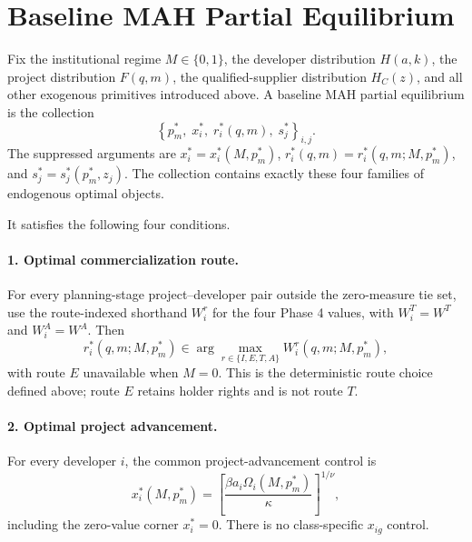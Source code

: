 \section{Baseline MAH Partial Equilibrium}
\label{sec:p07-equilibrium}

Fix the institutional regime \(M\in\{0,1\}\), the developer distribution
\(H(a,k)\), the project distribution \(F(q,m)\), the qualified-supplier
distribution \(H_C(z)\), and all other exogenous primitives introduced above.
A baseline MAH partial equilibrium is the collection
\begin{equation}
  \boxed{
  \left\{
    p_m^*,\;
    x_i^*,\;
    r_i^*(q,m),\;
    s_j^*
  \right\}_{i,j}}
  .
  \label{eq:p07-equilibrium-collection}
\end{equation}
The suppressed arguments are \(x_i^*=x_i^*(M,p_m^*)\),
\(r_i^*(q,m)=r_i^*(q,m;M,p_m^*)\), and
\(s_j^*=s_j^*(p_m^*,z_j)\). The collection contains exactly these four
families of endogenous optimal objects.

It satisfies the following four conditions.

\paragraph{1. Optimal commercialization route.}
For every planning-stage project--developer pair outside the zero-measure tie
set, use the route-indexed shorthand \(W_i^r\) for the four Phase 4
values, with \(W_i^T=W^T\) and \(W_i^A=W^A\). Then
\begin{equation}
  r_i^*(q,m;M,p_m^*)
  \in
  \arg\max_{r\in\{I,E,T,A\}}
  W_i^r(q,m;M,p_m^*),
  \label{eq:p07-route-optimality}
\end{equation}
with route \(E\) unavailable when \(M=0\). This is the deterministic route
choice defined above; route \(E\) retains holder rights and is not route \(T\).

\paragraph{2. Optimal project advancement.}
For every developer \(i\), the common project-advancement control is
\begin{equation}
  x_i^*(M,p_m^*)
  =
  \left[
    \frac{\beta a_i\Omega_i(M,p_m^*)}{\kappa}
  \right]^{1/\nu},
  \label{eq:p07-advancement-optimality}
\end{equation}
including the zero-value corner \(x_i^*=0\). There is no class-specific
\(x_{ig}\) control.

